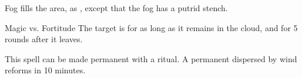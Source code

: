 \begin{spellheader}
\end{spellheader}
\begin{spellcontent}
    \begin{spelltargetinginfo}
    \end{spelltargetinginfo}
    \begin{spelleffects}
        \spelleffect Fog fills the area, as , except that the fog has a putrid stench.
        \spelldur{\durshort}
    \end{spelleffects}
\end{spellcontent}
\begin{spellsubcontent}
    \begin{spelltargetinginfo}
    \end{spelltargetinginfo}
    \begin{spelleffects}
        \begin{spellattack}{Magic vs. Fortitude}
            \spellsuccess The target is \sickened for as long as it remains in the cloud, and for 5 rounds after it leaves.
        \end{spellattack}
    \end{spelleffects}
\end{spellsubcontent}
\begin{spellfooter}
    \spellnotes This spell can be made permanent with a  ritual. A permanent  dispersed by wind reforms in 10 minutes. \fogspellnotes \fogwindspellnotes
\end{spellfooter}

